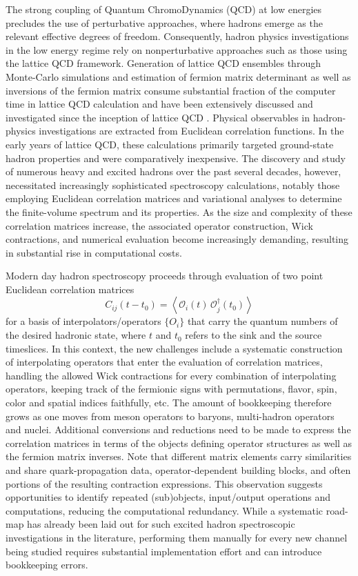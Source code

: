 \documentclass[a4paper,fleqn]{cas-dc}
\newcommand{\beq}{\begin{equation}}
\newcommand{\eeq}[1]{\label{eq:#1}\end{equation}}
\begin{document}
The strong coupling of Quantum ChromoDynamics (QCD) at low energies precludes the use of perturbative approaches, where hadrons emerge as the relevant effective degrees of freedom. Consequently, hadron physics investigations in the low energy regime rely on nonperturbative approaches such as those using the lattice QCD framework. Generation of lattice QCD ensembles through Monte-Carlo simulations and estimation of fermion matrix determinant as well as inversions of the fermion matrix consume substantial fraction of the computer time in lattice QCD calculation and have been extensively discussed and investigated since the inception of lattice QCD \cite{}. Physical observables in hadron-physics investigations are extracted from Euclidean correlation functions. In the early years of lattice QCD, these calculations primarily targeted ground-state hadron properties and were comparatively inexpensive. The discovery and study of numerous heavy and excited hadrons over the past several decades, however, necessitated increasingly sophisticated spectroscopy calculations, notably those employing Euclidean correlation matrices and variational analyses to determine the finite-volume spectrum and its properties. As the size and complexity of these correlation matrices increase, the associated operator construction, Wick contractions, and numerical evaluation become increasingly demanding, resulting in substantial rise in computational costs.

Modern day hadron spectroscopy proceeds through evaluation of two point Euclidean correlation matrices 
\beq 
C_{ij}(t-t_0)=\left\langle\mathcal O_i(t)\,\mathcal O_j^{\dagger}(t_0)\right\rangle
\eeq{2ptCfn}
for a basis of interpolators/operators $\{O_i\}$ that carry the quantum numbers of the desired hadronic state, where $t$ and $t_0$ refers to the sink and the source timeslices. In this context, the new challenges include a systematic construction of interpolating operators that enter the evaluation of correlation matrices, handling the allowed Wick contractions for every combination of interpolating operators, keeping track of the fermionic signs with permutations, flavor, spin, color and spatial indices faithfully, etc. The amount of bookkeeping therefore grows as one moves from meson operators to baryons, multi-hadron operators and nuclei. Additional conversions and reductions need to be made to express the correlation matrices in terms of the objects defining operator structures as well as the fermion matrix inverses. Note that different matrix elements carry similarities and share quark-propagation data, operator-dependent building blocks, and often portions of the resulting contraction expressions. This observation suggests opportunities to identify repeated (sub)objects, input/output operations and computations, reducing the computational redundancy. While a systematic road-map has already been laid out for such excited hadron spectroscopic investigations in the literature, performing them manually for every new channel being studied requires substantial implementation effort and can introduce bookkeeping errors.
\end{document}
